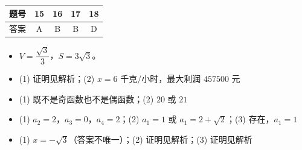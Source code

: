 \begin{center}\begin{tabular}{ccccc}
\toprule
题号 & 15 & 16 & 17 & 18 \\
\midrule
答案 & A & B & B & D \\
\bottomrule
\end{tabular}\end{center}

\begin{itemize}[leftmargin=2.6em]
  \item[\textbf{19.}] $V=\dfrac{\sqrt3}3$，$S=3\sqrt3$。
  \item[\textbf{20.}] (1) 证明见解析；(2) $x=6$ 千克/小时，最大利润 $457500$ 元
  \item[\textbf{21.}] (1) 既不是奇函数也不是偶函数；(2) $20$ 或 $21$
  \item[\textbf{22.}] (1) $a_2=2$，$a_3=0$，$a_4=2$；(2) $a_1=1$ 或 $a_1=2+\sqrt2$；(3) 存在，$a_1=1$
  \item[\textbf{23.}] (1) $x=-\sqrt3$（答案不唯一）；(2) 证明见解析；(3) 证明见解析
\end{itemize}
